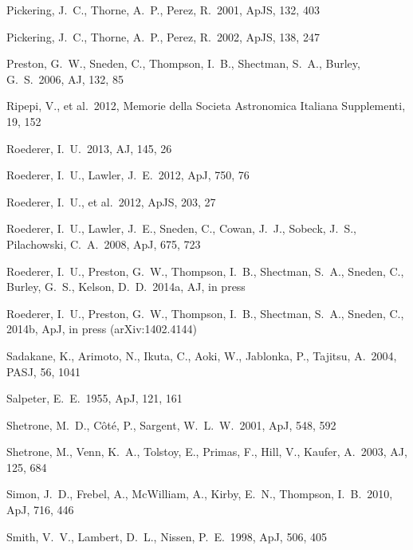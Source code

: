\documentclass[useAMS,usenatbib,usegraphicx]{mn2e}
\def\apj{ApJ}
\def\aj{AJ}
\def\apjs{ApJS}
\def\pasj{PASJ}
\begin{document}
\begin{thebibliography}{}
 Pickering, J.~C., 
Thorne, A.~P., Perez, R.\ 2001, \apjs, 132, 403 

 Pickering, J.~C., 
Thorne, A.~P., Perez, R.\ 2002, \apjs, 138, 247 

 Preston, G.~W., Sneden, 
C., Thompson, I.~B., Shectman, S.~A., Burley, G.~S.\ 2006, \aj, 132, 85 

 Ripepi, V., 
et al.\ 2012, Memorie della Societa Astronomica Italiana 
Supplementi, 19, 152 

 Roederer, I.~U.\ 2013, \aj, 145, 26 

 Roederer, I.~U.,
Lawler, J.~E.\ 2012, \apj, 750, 76

 Roederer, I.~U., 
et al.\ 2012, \apjs, 203, 27

 Roederer, I.~U., 
Lawler, J.~E., Sneden, C., Cowan, J.~J., Sobeck, J.~S., 
Pilachowski, C.~A.\ 2008, \apj, 675, 723 

 Roederer, I.~U., 
Preston, G.~W., Thompson, I.~B., Shectman, S.~A., Sneden, C., 
Burley, G.~S., Kelson, D.~D.\ 2014a, \aj, in press 

 Roederer, I.~U.,
Preston, G.~W., Thompson, I.~B., Shectman, S.~A., Sneden, C., 
2014b, \apj, in press (arXiv:1402.4144)

 Sadakane, K., Arimoto, N., 
Ikuta, C., Aoki, W., Jablonka, P., Tajitsu, A.\ 2004, \pasj, 56, 1041 

 Salpeter, E.~E.\ 1955, \apj, 121, 161 

Shetrone, M.~D., C{\^o}t{\'e}, P., Sargent, W.~L.~W.\ 2001, \apj, 548, 592 

 Shetrone, M., Venn, 
K.~A., Tolstoy, E., Primas, F., Hill, V., Kaufer, A.\ 2003, \aj, 125, 684 

 Simon, J.~D., Frebel, A., 
McWilliam, A., Kirby, E.~N., Thompson, I.~B.\ 2010, \apj, 716, 446 

 Smith, V.~V., Lambert, 
D.~L., Nissen, P.~E.\ 1998, \apj, 506, 405 


\end{thebibliography}
\end{document}

